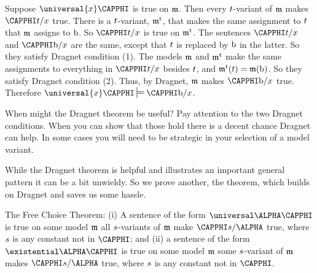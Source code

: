 \begin{PROOF}
Suppose $\universal{\variable{x}}\CAPPHI$ is true on $\mathfrak{m}$. 
Then every $t$-variant of $\mathfrak{m}$ makes $\CAPPHI\variable{t}/\variable{x}$ true.
There is a $t$-variant, $\mathfrak{m^{\mathrm{t}}_{\mathrm{}}}$, that makes the same assignment to $t$ that $\mathfrak{m}$ assigns to $\mathrm{b}$.
So $\CAPPHI\variable{t}/\variable{x}$ is true on $\mathfrak{m^{\mathrm{t}}_{\mathrm{}}}$.
The sentences $\CAPPHI\variable{t}/\variable{x}$ and $\CAPPHI\constant{b}/\variable{x}$ are the same, except that $t$ is replaced by $\mathrm{b}$ in the latter.
So they satisfy Dragnet condition (1).
The models $\mathfrak{m}$ and $\mathfrak{m^{\mathrm{t}}_{\mathrm{}}}$ make the same assignments to everything in $\CAPPHI\variable{t}/\variable{x}$ besides $t$, and $\mathfrak{m^{\mathrm{t}}_{\mathrm{}}}(t)=\mathfrak{m}(\mathrm{b})$.
So they satisfy Dragnet condition (2).
Thus, by Dragnet, $\mathfrak{m}$ makes $\CAPPHI\constant{b}/\variable{x}$ true.
Therefore $\universal{\variable{x}}\CAPPHI\sdtstile{}{}\CAPPHI\constant{b}/\variable{x}$.
\end{PROOF} 

When might the Dragnet theorem be useful? 
Pay attention to the two Dragnet conditions.
When you can show that those hold there is a decent chance Dragnet can help.
In some cases you will need to be strategic in your selection of a model variant.

While the Dragnet theorem is helpful and illustrates an important general pattern it can be a bit unwieldy.
So we prove another, the  theorem, which builds on Dragnet and saves us some hassle.

\begin{THEOREM}{ The Free Choice Theorem:}
(i) A \GQL{} sentence of the form $\universal\ALPHA\CAPPHI$ is true on some model $\mathfrak{m}$ \Iff all $s$-variants of $\mathfrak{m}$ make $\CAPPHI\variable{s}/\ALPHA$ true, where $s$ is any constant not in $\CAPPHI$; and (ii) a \GQL{} sentence of the form $\existential\ALPHA\CAPPHI$ is true on some model $\mathfrak{m}$ \Iff some $s$-variant of $\mathfrak{m}$ makes $\CAPPHI\variable{s}/\ALPHA$ true, where $s$ is any constant not in $\CAPPHI$.
\end{THEOREM}

